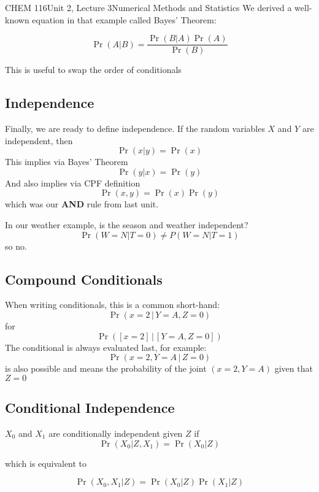 \documentclass{article}
\begin{document}
\begin{tdoc}{CHEM 116}{Unit 2, Lecture 3}{Numerical Methods and Statistics}
We derived a well-known equation in that example called Bayes' Theorem:

\begin{equation}
\Pr(A|B) = \frac{\Pr(B|A)\Pr(A)}{\Pr(B)}
\end{equation}

This is useful to swap the order of conditionals

\subsection{Independence}
Finally, we are ready to define independence. If the random variables
$X$ and $Y$ are independent, then
\begin{equation}
\Pr(x|y) = \Pr(x)
\end{equation}
This implies via Bayes' Theorem
\begin{equation}
\Pr(y|x) = \Pr(y)
\end{equation}
And also implies via CPF definition
\begin{equation}
\Pr(x,y) = \Pr(x)\Pr(y)
\end{equation}
which was our {\bf AND} rule from last unit.

\vspace{0.2cm}
In our weather example, is the season and weather independent?
\[
\Pr(W=N|T=0) \neq P(W=N|T=1)
\]
so no.


\subsection{Compound Conditionals}
When writing conditionals, this is a common short-hand:
\[
\Pr (x = 2\, | \,Y = A, Z = 0)
\]
for
\[
\Pr ([x = 2]\,|\, [Y = A, Z = 0])
\]
The conditional is always evaluated last, for example:
\[
\Pr(x = 2, Y = A\, | \,Z = 0)
\]
is also possible and means the probability of the joint $(x=2, Y=A)$
given that $Z = 0$



\subsection{Conditional Independence}
$X_0$ and $X_1$ are conditionally independent given $Z$ if
\begin{equation}
\Pr(X_0 | Z, X_1) = \Pr(X_0 | Z)
\end{equation}

which is equivalent to

\begin{equation}
\Pr(X_0, X_1 | Z) = \Pr(X_0 | Z)\Pr(X_1 | Z)
\end{equation}



\end{tdoc}
\end{document}
